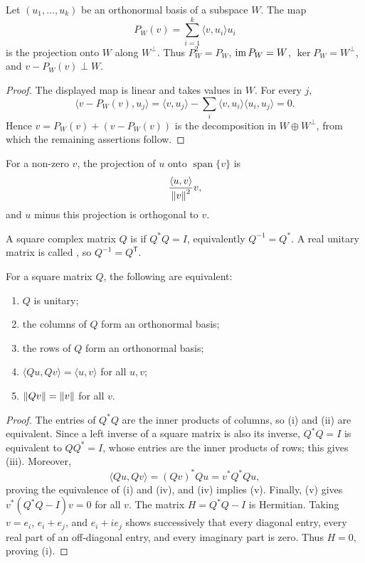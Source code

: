 \begin{Theorem}\label{thm:OrthogonalProjection}
Let $(u_1,\ldots,u_k)$ be an orthonormal basis of a subspace $W$. The map
\begin{equation*}
P_W(v)=\sum_{i=1}^k\langle v,u_i\rangle u_i
\end{equation*}
is the projection onto $W$ along $W^\perp$. Thus $P_W^2=P_W$, $\operatorname{im} P_W=W$, $\ker P_W=W^\perp$, and $v-P_W(v)\perp W$.
\end{Theorem}
\begin{proof}
The displayed map is linear and takes values in $W$. For every $j$,
\begin{equation*}
\langle v-P_W(v),u_j\rangle=\langle v,u_j\rangle-\sum_i\langle v,u_i\rangle\langle u_i,u_j\rangle=0.
\end{equation*}
Hence $v=P_W(v)+(v-P_W(v))$ is the decomposition in $W\oplus W^\perp$, from which the remaining assertions follow.
\end{proof}

For a non-zero $v$, the projection of $u$ onto $\operatorname{span}\{v\}$ is
\begin{equation*}
\frac{\langle u,v\rangle}{\norm{v}^2}v,
\end{equation*}
and $u$ minus this projection is orthogonal to $v$.

\begin{Definition}
A square complex matrix $Q$ is  if $Q^*Q=I$, equivalently $Q^{-1}=Q^*$. A real unitary matrix is called , so $Q^{-1}=Q^{\mathsf T}$.
\end{Definition}

\begin{Theorem}
For a square matrix $Q$, the following are equivalent:
\begin{enumerate}[label=(\roman*)]
\item $Q$ is unitary;
\item the columns of $Q$ form an orthonormal basis;
\item the rows of $Q$ form an orthonormal basis;
\item $\langle Qu,Qv\rangle=\langle u,v\rangle$ for all $u,v$;
\item $\norm{Qv}=\norm{v}$ for all $v$.
\end{enumerate}
\end{Theorem}
\begin{proof}
The entries of $Q^*Q$ are the inner products of columns, so (i) and (ii) are equivalent. Since a left inverse of a square matrix is also its inverse, $Q^*Q=I$ is equivalent to $QQ^*=I$, whose entries are the inner products of rows; this gives (iii). Moreover,
\begin{equation*}
\langle Qu,Qv\rangle=(Qv)^*Qu=v^*Q^*Qu,
\end{equation*}
proving the equivalence of (i) and (iv), and (iv) implies (v). Finally, (v) gives $v^*(Q^*Q-I)v=0$ for all $v$. The matrix $H=Q^*Q-I$ is Hermitian. Taking $v=e_i$, $e_i+e_j$, and $e_i+ie_j$ shows successively that every diagonal entry, every real part of an off-diagonal entry, and every imaginary part is zero. Thus $H=0$, proving (i).
\end{proof}


